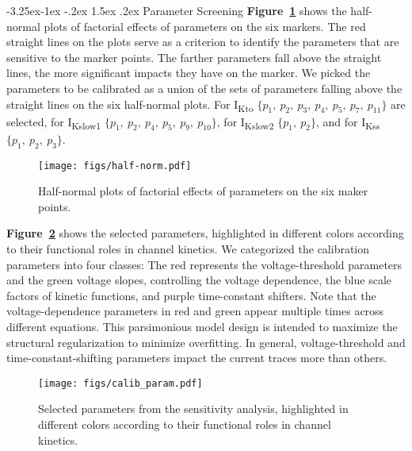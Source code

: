 \documentclass[11pt]{article}
\makeatletter
\renewcommand\subsection{\@startsection{subsection}{2}{\z@}%
                                     {-3.25ex\@plus -1ex \@minus -.2ex}%
                                     {1.5ex \@plus .2ex}%
                                     {\normalfont\fontfamily{phv}\fontsize{14}{17}\bfseries}}
\makeatother
\begin{document}
\subsection{Parameter Screening}
\textbf{Figure~\ref{fig:half-norm}} shows the half-normal plots of factorial effects of parameters on the six markers. The red straight lines on the plots serve as a criterion to identify the parameters that are sensitive to the marker points. The farther parameters fall above the straight lines, the more significant impacts they have on the marker. We picked the parameters to be calibrated as a union of the sets of parameters falling above the straight lines on the six half-normal plots. For I\textsubscript{Kto} $\{p_{1},\ p_{2},\ p_{3},\ p_{4},\ p_{5},\ p_{7},\ p_{11}\}$ are selected, for I\textsubscript{Kslow1} $\{p_{1},\ p_{2},\ p_{4},\ p_{5},\ p_{9},\ p_{10}\}$, for I\textsubscript{Kslow2} $\{p_{1},\ p_{2}\}$, and for I\textsubscript{Kss} $\{p_{1},\ p_{2},\ p_{3}\}$. 
\begin{figure}
    \centering
    \texttt{[image: figs/half-norm.pdf]}
    \caption{Half-normal plots of factorial effects of parameters on the six maker points.}
    \label{fig:half-norm}
\end{figure}
\textbf{Figure~\ref{fig:calib_param}} shows the selected parameters, highlighted in different colors according to their functional roles in channel kinetics. We categorized the calibration parameters into four classes: The red represents the voltage-threshold parameters and the green voltage slopes, controlling the voltage dependence, the blue scale factors of kinetic functions, and purple time-constant shifters. Note that the voltage-dependence parameters in red and green appear multiple times across different equations. This parsimonious model design is intended to maximize the structural regularization to minimize overfitting. In general, voltage-threshold and time-constant-shifting parameters impact the current traces more than others. 
\begin{figure}[!ht]
    \centering
    \texttt{[image: figs/calib\_param.pdf]}
    \caption{Selected parameters from the sensitivity analysis, highlighted in different colors according to their functional roles in channel kinetics.}
    \label{fig:calib_param}
\end{figure}
\end{document}
